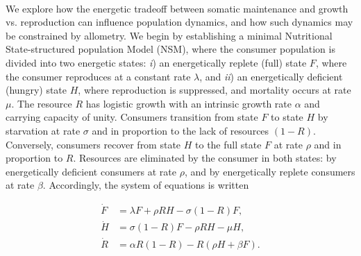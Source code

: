 \documentclass{pnastwo}
\begin{document}
\begin{article}
 \\ \nonumber
We explore how the energetic tradeoff between somatic maintenance and growth vs. reproduction can influence population dynamics, and how such dynamics may be constrained by allometry.
We begin by establishing a minimal Nutritional State-structured population Model (NSM), where the consumer population is divided into two energetic states: \emph{i}) an energetically replete (full) state $F$, where the consumer reproduces at a constant rate $\lambda$, and \emph{ii}) an energetically deficient (hungry) state $H$, where reproduction is suppressed, and mortality occurs at rate $\mu$.
The resource $R$ has logistic growth with an intrinsic growth rate $\alpha$ and carrying capacity of unity. %
Consumers transition from state $F$ to state $H$ by starvation at rate $\sigma$ and in proportion to the lack of resources $(1-R)$.
Conversely, consumers recover from state $H$ to the full state $F$ at rate $\rho$ and in proportion to $R$.
Resources are eliminated by the consumer in both states: by energetically deficient consumers at rate $\rho$, and by energetically replete consumers at rate $\beta$.
Accordingly, the system of equations is written


\begin{equation} \label{eq:system}
\begin{aligned}
\dot{F} &= \lambda F + \rho RH - \sigma (1-R)F,  \\
\dot{H} &= \sigma (1-R)F - \rho RH - \mu H,  \\
\dot{R} &= \alpha R(1-R) - R(\rho H+ \beta F).
\end{aligned}
\end{equation}



\end{article}
\end{document}
